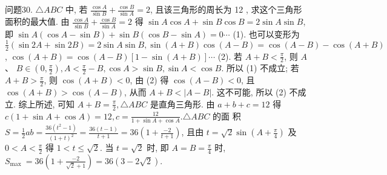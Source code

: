 问题30. $\triangle A B C$ 中, 若 $\frac{\cos A}{\sin B}+\frac{\cos B}{\sin A}=2$, 且该三角形的周长为 12 , 求这个三角形面积的最大值.
由 $\frac{\cos A}{\sin B}+\frac{\cos B}{\sin A}=2$ 得 $\sin A \cos A+\sin B \cos B=2 \sin A \sin B$, 即 $\sin A(\cos A-\sin B)+\sin B(\cos B-\sin A)=0 \cdots$ (1). 也可以变形为 $\frac{1}{2}(\sin 2 A+ \sin 2 B)=2 \sin A \sin B, \sin (A+B) \cos (A-B)=\cos (A-B)-\cos (A+B)$, $\cos (A+B)=\cos (A-B)[1-\sin (A+B)] \cdots$ (2). 若 $A+B<\frac{\pi}{2}$, 则 $A$ 、 $B \in\left(0, \frac{\pi}{2}\right), A<\frac{\pi}{2}-B, \cos A>\sin B, \sin A<\cos B$. 所以 (1) 不成立; 若 $A+B>\frac{\pi}{2}$, 则 $\cos (A+B)<0$, 由 (2) 得 $\cos (A-B)<0$, 且 $\cos (A+B)> \cos (A-B)$, 从而 $A+B<|A-B|$. 这不可能, 所以 (2) 不成立.
综上所述, 可知 $A+B=\frac{\pi}{2}, \triangle A B C$ 是直角三角形.
由 $a+b+c=12$ 得 $c(1+\sin A+ \cos A)=12, c=\frac{12}{1+\sin A+\cos A} . \triangle A B C$ 的面 积 $S=\frac{1}{2} a b= \frac{36\left(t^2-1\right)}{(1+t)^2}=\frac{36(t-1)}{t+1}=36\left(1+\frac{-2}{t+1}\right)$, 且由 $t=\sqrt{2} \sin \left(A+\frac{\pi}{4}\right)$ 及 $0< A<\frac{\pi}{2}$ 得 $1<t \leqslant \sqrt{2}$. 当 $t=\sqrt{2}$ 时, 即 $A=B=\frac{\pi}{4}$ 时, $S_{\text {max }}=36\left(1+\frac{-2}{\sqrt{2}+1}\right)= 36(3-2 \sqrt{2})$.


